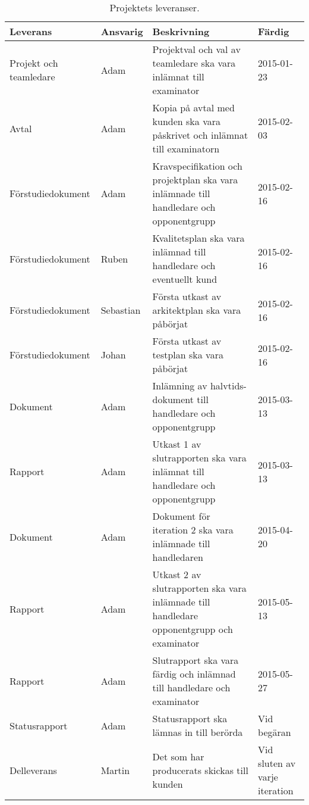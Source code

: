\begin{table}[H]
  \centering
    \begin{tabularx}{\textwidth}{| X | l | X | l |}
      \hline
      \textbf{Leverans} & \textbf{Ansvarig} & \textbf{Beskrivning} & \textbf{Färdig} \\
      \hline

      {Projekt och teamledare} & {Adam} & {Projektval och val av teamledare ska vara inlämnat till examinator} & {2015-01-23} \\
            \hline
      {Avtal} & {Adam} & {Kopia på avtal med kunden ska vara påskrivet och inlämnat till examinatorn} & {2015-02-03} \\
      \hline
      {Förstudiedokument} & {Adam} & {Kravspecifikation och projektplan ska vara inlämnade till handledare och opponentgrupp} & {2015-02-16} \\
      \hline
      {Förstudiedokument} & {Ruben} & {Kvalitetsplan ska vara inlämnad till handledare och eventuellt kund} & {2015-02-16} \\
      \hline
      {Förstudiedokument} & {Sebastian} & {Första utkast av arkitektplan ska vara påbörjat} & {2015-02-16} \\
      \hline
      {Förstudiedokument} & {Johan} & {Första utkast av testplan ska vara påbörjat} & {2015-02-16} \\
      \hline
      {Dokument} & {Adam} & {Inlämning av halvtids-dokument till handledare och opponentgrupp} & {2015-03-13} \\
      \hline
      {Rapport} & {Adam} & {Utkast 1 av slutrapporten ska vara inlämnat till handledare och opponentgrupp} & {2015-03-13} \\
      \hline
      {Dokument} & {Adam} & {Dokument för iteration 2 ska vara inlämnade till handledaren} & {2015-04-20} \\
      \hline
      {Rapport} & {Adam} & {Utkast 2 av slutrapporten ska vara inlämnade till handledare opponentgrupp och examinator} & {2015-05-13} \\
      \hline
      {Rapport} & {Adam} & {Slutrapport ska vara färdig och inlämnad till handledare och examinator} & {2015-05-27} \\
      \hline
      {Statusrapport} & {Adam} & {Statusrapport ska lämnas in till berörda} & {Vid begäran} \\
      \hline
      {Delleverans} & {Martin} & {Det som har producerats skickas till kunden} & {Vid sluten av varje iteration} \\
      \hline

    \end{tabularx}
  \caption{Projektets leveranser.} \label{dokumentation:tabell}
\end{table}



